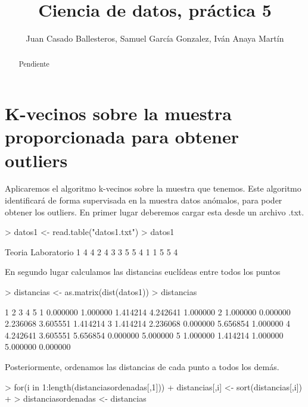 \documentclass [a4paper] {article}
\title{Ciencia de datos, práctica 5}
\author{Juan Casado Ballesteros, Samuel García Gonzalez, Iván Anaya Martín}
\begin{document}
\maketitle

\begin{abstract}
Pendiente
\end{abstract}

\newpage

\newpage
\section{K-vecinos sobre la muestra proporcionada para obtener outliers}
Aplicaremos el algoritmo k-vecinos sobre la muestra que tenemos.
Este algoritmo identificará de forma supervisada en la muestra datos anómalos, para poder obtener los outliers.
En primer lugar deberemos cargar esta desde un archivo .txt.
\begin{Schunk}
\begin{Sinput}
> datos1 <- read.table("datos1.txt")
> datos1
\end{Sinput}
\begin{Soutput}
  Teoria Laboratorio
1      4           4
2      4           3
3      5           5
4      1           1
5      5           4
\end{Soutput}
\end{Schunk}

En segundo lugar calculamos las distancias euclídeas entre todos los puntos
\begin{Schunk}
\begin{Sinput}
> distancias <- as.matrix(dist(datos1))
> distancias
\end{Sinput}
\begin{Soutput}
         1        2        3        4        5
1 0.000000 1.000000 1.414214 4.242641 1.000000
2 1.000000 0.000000 2.236068 3.605551 1.414214
3 1.414214 2.236068 0.000000 5.656854 1.000000
4 4.242641 3.605551 5.656854 0.000000 5.000000
5 1.000000 1.414214 1.000000 5.000000 0.000000
\end{Soutput}
\end{Schunk}

Posteriormente, ordenamos las distancias de cada punto a todos los demás.
\begin{Schunk}
\begin{Sinput}
> for(i in 1:length(distanciasordenadas[,1])){
+   distancias[,i] <- sort(distancias[,i])
+ }
> distanciasordenadas <- distancias
\end{Sinput}
\end{Schunk}
\end{document}
